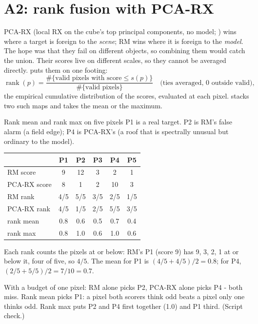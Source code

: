 \section{A2: rank fusion with PCA-RX}\label{sec:scoringgains:a2}

PCA-RX (local RX on the cube's top principal components, no model; \citet{reed1990adaptive}) wins where a target is foreign
to the \emph{scene}; RM wins where it is foreign to the \emph{model}. The hope was that they fail on different objects, so
combining them would catch the union. Their scores live on different scales, so they cannot be averaged directly.
 puts them on one footing:
\begin{equation}
\operatorname{rank}(p) = \frac{\#\{\text{valid pixels with score} \le s(p)\}}{\#\{\text{valid pixels}\}} \quad
\text{(ties averaged, 0 outside valid)}, \label{eq:scoringgains:rank}
\end{equation}
the empirical cumulative distribution of the scores, evaluated at each pixel.  stacks two such maps and takes
the mean or the maximum.

\begin{worked}[label={we:scoringgains:rank}]{Rank mean and rank max on five pixels}
P1 is a real target. P2 is RM's false alarm (a field edge); P4 is PCA-RX's (a roof that is spectrally unusual but ordinary
to the model).
\begin{center}
\small
\begin{tabular}{lccccc}
\toprule
 & P1 & P2 & P3 & P4 & P5 \\
\midrule
RM score & 9 & 12 & 3 & 2 & 1 \\
PCA-RX score & 8 & 1 & 2 & 10 & 3 \\
RM rank & 4/5 & 5/5 & 3/5 & 2/5 & 1/5 \\
PCA-RX rank & 4/5 & 1/5 & 2/5 & 5/5 & 3/5 \\
rank mean & 0.8 & 0.6 & 0.5 & 0.7 & 0.4 \\
rank max & 0.8 & 1.0 & 0.6 & 1.0 & 0.6 \\
\bottomrule
\end{tabular}
\end{center}
Each rank counts the pixels at or below: RM's P1 (score 9) has 9, 3, 2, 1 at or below it, four of five, so $4/5$. The mean
for P1 is $(4/5 + 4/5)/2 = 0.8$; for P4, $(2/5 + 5/5)/2 = 7/10 = 0.7$.

With a budget of one pixel: RM alone picks P2, PCA-RX alone picks P4 - both miss. Rank mean picks P1: a pixel both scorers
think odd beats a pixel only one thinks odd. Rank max puts P2 and P4 first together (1.0) and P1 third. (Script
check\tagC.)
\end{worked}

